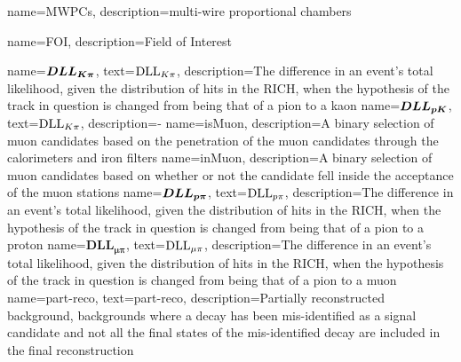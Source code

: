                  {
                   name=MWPCs,
                                      description={multi-wire proportional chambers}
                 }


                 {
                   name=FOI,
                                      description={Field of Interest}
                 }

                 
                 {
                   name=$\mathbold{DLL_{\kaon\pi}}$,
                  text=$\mathrm{DLL}_{{K}{\pi}}$,
                 description={The difference in an event’s total likelihood, given the distribution of hits in the RICH, when the hypothesis of the track in question is changed from being that of a pion to a kaon
}}
                 {
                   name=$\mathbold{DLL_{\proton\kaon}}$,
                  text=$\mathrm{DLL}_{{K}{\pi}}$,
                 description={\dllppi-\dllkpi}}
                 {
                   name=isMuon,
                                    description={A binary selection of muon candidates based on the penetration of the muon candidates through the calorimeters and iron filters}
                                        }
                 {
                   name=inMuon,
                                    description={A binary selection of muon candidates based on whether or not the candidate fell inside the acceptance of the muon stations}
}                                        
                 {
                   name=$\mathbold{DLL_{\proton\pi}}$,
                  text=$\mathrm{DLL}_{{p}{\pi}}$,
                 description={The difference in an event’s total likelihood, given the distribution of hits in the RICH, when the hypothesis of the track in question is changed from being that of a pion to a proton}                
                                       }
                 {
                   name=$\mathbold{DLL_{\mu\pi}}$,
                  text=$\mathrm{DLL}_{{\mu}\pi}$,
                 description={The difference in an event’s total likelihood, given the distribution of hits in the RICH, when the hypothesis of the track in question is changed from being that of a pion to a muon 
}}
                 {
                   name=part-reco,
                  text=part-reco,
                 description={Partially reconstructed background, backgrounds where a decay has been mis-identified as a signal candidate and not all the final states of the mis-identified decay are included in the final reconstruction  
}}
